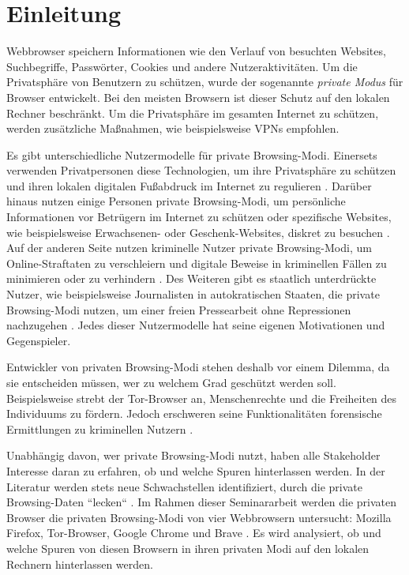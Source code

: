 \chapter{Einleitung}
Webbrowser speichern Informationen wie den Verlauf von besuchten Websites, Suchbegriffe, Passwörter, Cookies und andere Nutzeraktivitäten. 
Um die Privatsphäre von Benutzern zu schützen, wurde der sogenannte \textit{private Modus} für Browser entwickelt.
Bei den meisten Browsern ist dieser Schutz auf den lokalen Rechner beschränkt. \cite{Rochmadi.2017} Um die Privatsphäre im gesamten Internet zu schützen, werden zusätzliche Maßnahmen, wie beispielsweise VPNs empfohlen. \cite{Perdices.2023}

Es gibt unterschiedliche Nutzermodelle für private Browsing-Modi. Einersets verwenden Privatpersonen diese Technologien, um ihre Privatsphäre zu schützen und ihren lokalen digitalen Fußabdruck im Internet zu regulieren \cite{Horsman.2019}. Darüber hinaus nutzen einige Personen private Browsing-Modi, um persönliche Informationen vor Betrügern im Internet zu schützen oder spezifische Websites, wie beispielsweise Erwachsenen- oder Geschenk-Websites, diskret zu besuchen \cite{Aggarwal.2010}. Auf der anderen Seite nutzen kriminelle Nutzer private Browsing-Modi, um Online-Straftaten zu verschleiern und digitale Beweise in kriminellen Fällen zu minimieren oder zu verhindern \cite{Montasari.2015, Rochmadi.2017}. Des Weiteren gibt es staatlich unterdrückte Nutzer, wie beispielsweise Journalisten in autokratischen Staaten, die private Browsing-Modi nutzen, um einer freien Pressearbeit ohne Repressionen nachzugehen \cite{Rathod.2017}. Jedes dieser Nutzermodelle hat seine eigenen Motivationen und Gegenspieler.

Entwickler von privaten Browsing-Modi stehen deshalb vor einem Dilemma, da sie entscheiden müssen, wer zu welchem Grad geschützt werden soll. Beispielsweise strebt der Tor-Browser an, Menschenrechte und die Freiheiten des Individuums zu fördern. \cite{Tor.24.05.2023}
Jedoch erschweren seine Funktionalitäten forensische Ermittlungen zu kriminellen Nutzern \cite{Muir.2019, Rathod.2017}.

Unabhängig davon, wer private Browsing-Modi nutzt, haben alle Stakeholder Interesse daran zu erfahren, ob und welche Spuren hinterlassen werden. In der Literatur werden stets neue Schwachstellen identifiziert, durch die private Browsing-Daten ``lecken`` \cite{Satvat.2014}.
Im Rahmen dieser Seminararbeit werden die privaten Browser die privaten Browsing-Modi von vier Webbrowsern untersucht: Mozilla Firefox, Tor-Browser, Google Chrome und Brave \cite{Montasari.2015}. Es wird analysiert, ob und welche Spuren von diesen Browsern in ihren privaten Modi auf den lokalen Rechnern hinterlassen werden.
